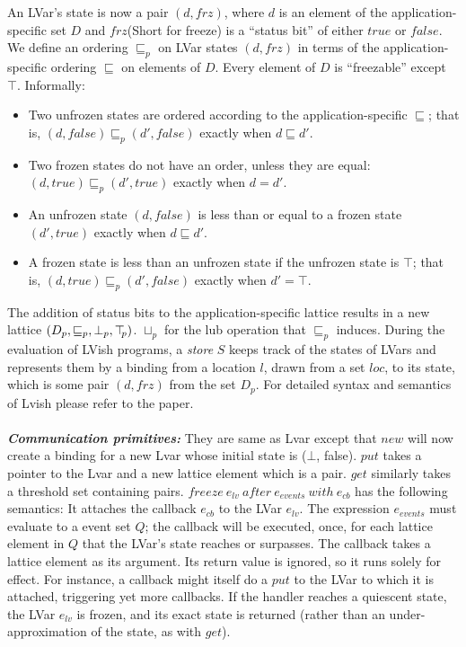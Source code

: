 \documentclass[twocolumn]{article}
\newcommand{\userleq}{\ensuremath{\sqsubseteq}}
\newcommand{\lubp}[2]{\ensuremath{#1 \sqcup_p #2}}
\newcommand{\leqp}{\ensuremath{\sqsubseteq_p}}
\newcommand{\botp}{\ensuremath{\bot_{p}}}
\newcommand{\topp}{\ensuremath{\top\hspace{-0.85mm}_{p}}}
\newcommand{\state}[2]{\ensuremath{(#1, #2)}}
\newcommand{\status}{\ensuremath{\mathit{frz}}}
\begin{document}
An LVar’s state is now a pair $(d,frz )$, where $d$ is an element of the application-specific set $D$ and $frz$(Short for freeze) is a “status bit” of either $true$ or $false$. We define an ordering $\leqp$ on LVar states $\state{d}{\status}$ in terms of the application-specific ordering $\userleq$ on elements of $D$. Every element of $D$ is ``freezable'' except $\top$. Informally: 
\begin{itemize}
\item Two unfrozen states are ordered according to the application-specific $\userleq$; that is, $(d,false) \leqp (d',false)$
exactly when $d \userleq d'$.
\item Two frozen states do not have an order, unless they are equal: $(d,true) \leqp (d',true)$ exactly when $d = d'$.
\item An unfrozen state $(d,false)$ is less than or equal to a frozen state $(d',true)$ exactly when $d \userleq d'$.
\item A frozen state is less than an unfrozen state if the unfrozen state is $\top$; that is, $(d,true) \leqp (d',false)$ exactly when $d' = \top$.
\end{itemize}
The addition of status bits to the application-specific lattice results in a new lattice $(D_p, \leqp, \botp, \topp)$. $\lubp{}{}$ for the lub operation that $\leqp$ induces. During the evaluation of LVish programs, a \emph{store} $S$ keeps track of the states of LVars and represents them by a binding from a location $l$, drawn from a set $loc$, to its state, which is some pair $(d, frz)$ from the set $D_p$. For detailed syntax and semantics of Lvish please refer to the paper\cite{lkuper2}.\\ \\
\textbf{\textit{Communication primitives:}} They are same as Lvar except that $new$ will now create a binding for a new Lvar whose initial state is ($\bot$, false). $put$ takes a pointer to the Lvar and a new lattice element which is a pair. $get$ similarly takes a threshold set containing pairs. $freeze\ e_{lv}\ after\ e_{events}\ with\ e_{cb}$ has the following semantics: It attaches the callback $e_{cb}$ to the LVar $e_{lv}$. The expression $e_{events}$ must evaluate to a event set $Q$; the callback will be executed, once, for each lattice element in $Q$ that the LVar’s state reaches or surpasses. The callback takes a lattice element as its argument. Its return value is ignored, so it runs solely for effect. For instance, a callback might itself do a $put$ to the LVar to which it is attached, triggering yet more callbacks. If the handler reaches a quiescent state, the LVar $e_{lv}$ is frozen, and its exact state is returned (rather than an under-approximation of the state, as with $get$).
\end{document}

